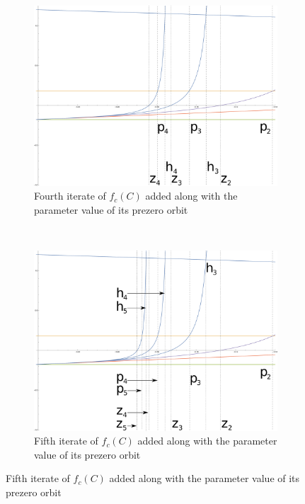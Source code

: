 \begin{figure}[ht]
\begin{subfigure}[b]{0.5\textwidth}
		\end{subfigure}
		\begin{subfigure}[b]{0.5\textwidth}
				\includegraphics[width=\textwidth]{./img/cplot3S}
				\caption{Fourth iterate of $f_c (C)$ added along with the parameter value of its prezero orbit}
				\label{fig:cplot3S}
		\end{subfigure}%
		~ %
		\begin{subfigure}[b]{0.5\textwidth}
				\includegraphics[width=\textwidth]{./img/cplot4S}
				\caption{Fifth iterate of $f_c (C)$ added along with the parameter value of its prezero orbit}
				\label{fig:cplot4S}

\end{subfigure}
\end{figure}
